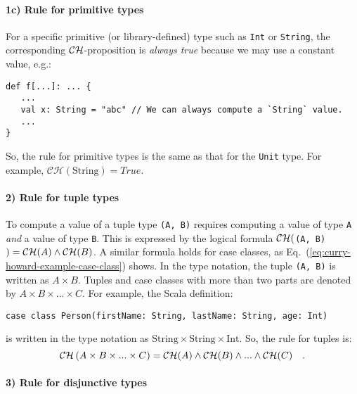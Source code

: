 \paragraph{1c) Rule for primitive types}

For a specific primitive (or library-defined) type such as \lstinline!Int!
or \lstinline!String!, the corresponding ${\cal CH}$-proposition
is \emph{always true} because we may use a constant value, e.g.:
\begin{lstlisting}
def f[...]: ... {
   ...
   val x: String = "abc" // We can always compute a `String` value.
   ...
}
\end{lstlisting}
So, the rule for primitive types is the same as that for the \lstinline!Unit!
type. For example, $\mathcal{CH}(\text{String})=True$.

\paragraph{2) Rule for tuple types}

To compute a value of a tuple type \lstinline!(A, B)! requires computing
a value of type \lstinline!A! \emph{and} a value of type \lstinline!B!.
This is expressed by the logical formula ${\cal CH}($\lstinline!(A, B)!$)={\cal CH}(A)\wedge{\cal CH}(B)$.
A similar formula holds for case classes, as Eq.~(\ref{eq:curry-howard-example-case-class})
shows. In the type notation, the tuple \lstinline!(A, B)! is written
as $A\times B$. Tuples and case classes with more than two parts
are denoted by $A\times B\times...\times C$. For example, the Scala
definition:
\begin{lstlisting}
case class Person(firstName: String, lastName: String, age: Int)
\end{lstlisting}
is written in the type notation as $\text{String}\times\text{String}\times\text{Int}$.
So, the rule for tuples is:
\[
{\cal CH}\left(A\times B\times...\times C\right)={\cal CH}(A)\wedge{\cal CH}(B)\wedge...\wedge{\cal CH}(C)\quad.
\]


\paragraph{3) Rule for disjunctive types}

